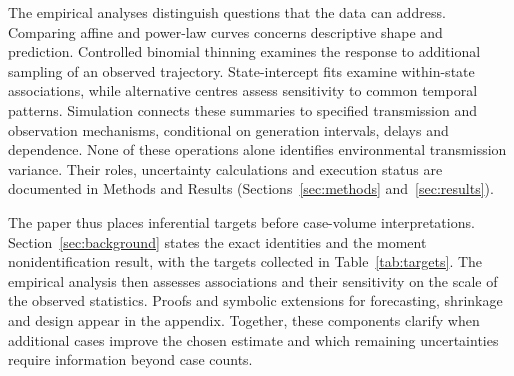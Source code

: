 The empirical analyses distinguish questions that the data can address. Comparing affine and power-law curves concerns descriptive shape and prediction. Controlled binomial thinning examines the response to additional sampling of an observed trajectory. State-intercept fits examine within-state associations, while alternative centres assess sensitivity to common temporal patterns. Simulation connects these summaries to specified transmission and observation mechanisms, conditional on generation intervals, delays and dependence. None of these operations alone identifies environmental transmission variance. Their roles, uncertainty calculations and execution status are documented in Methods and Results (Sections~\ref{sec:methods} and~\ref{sec:results}).

The paper thus places inferential targets before case-volume interpretations. Section~\ref{sec:background} states the exact identities and the moment nonidentification result, with the targets collected in Table~\ref{tab:targets}. The empirical analysis then assesses associations and their sensitivity on the scale of the observed statistics. Proofs and symbolic extensions for forecasting, shrinkage and design appear in the appendix. Together, these components clarify when additional cases improve the chosen estimate and which remaining uncertainties require information beyond case counts.
